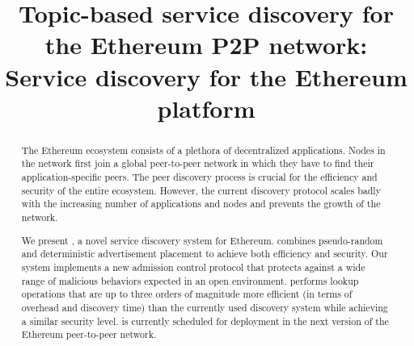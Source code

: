 \documentclass[conference]{IEEEtran}
\begin{document}
\title{Topic-based service discovery for the Ethereum P2P network}
\title{\sysname: Service discovery for the Ethereum platform}
\author{}
\maketitle
    \vspace{-0.90in}
\begin{abstract}
The Ethereum ecosystem consists of a plethora of decentralized applications. Nodes in the network first join a global peer-to-peer network in which they have to find their application-specific peers. The peer discovery process is crucial for the efficiency and security of the entire ecosystem. However, the current discovery protocol scales badly with the increasing number of applications and nodes and prevents the growth of the network.

We present \sysname, a novel service discovery system for Ethereum. \sysname combines pseudo-random and deterministic advertisement placement to achieve both efficiency and security. Our system implements a new admission control protocol that protects against a wide range of malicious behaviors expected in an open environment. 
\sysname performs lookup operations that are up to three orders of magnitude more efficient (in terms of overhead and discovery time) than the currently used discovery system while achieving a similar security level. \sysname is currently scheduled for deployment in the next version of the Ethereum peer-to-peer network. 

\end{abstract}


%


\end{document}
